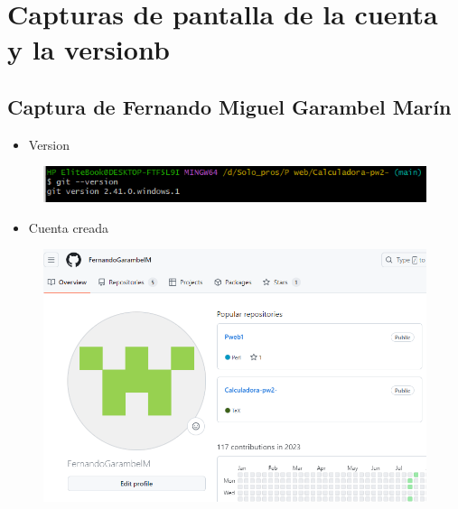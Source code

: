 \documentclass{article}
\begin{document}
	\section{Capturas de pantalla de la cuenta y la versionb}
		\subsection{Captura de Fernando Miguel Garambel Marín}
	\begin{itemize}
		\item Version
	\end{itemize}
	\begin{figure}[H]
		\centering
		\includegraphics[width=1.0\textwidth,keepaspectratio]{img/FernandoVersion.PNG}
	\end{figure}
	\begin{itemize}
		\item Cuenta creada
	\end{itemize}
	\begin{figure}[H]
		\centering
		\includegraphics[width=1.0\textwidth,keepaspectratio]{img/FernandoCuenta.PNG}
	\end{figure}
	\clearpage
\end{document}
